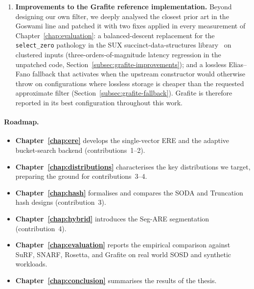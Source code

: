 \begin{enumerate}
    \item \textbf{Improvements to the Grafite reference implementation.}
    Beyond designing our own filter, we deeply analysed the closest
    prior art in the Goswami line and patched it with two
    fixes applied in every measurement of
    Chapter~\ref{chap:evaluation}: a balanced-descent replacement for
    the \texttt{select\_zero} pathology in the SUX
    succinct-data-structures library~\citep{vigna2008broadword} on clustered inputs
    (three-orders-of-magnitude latency regression in the unpatched
    code, Section~\ref{subsec:grafite-improvements}); and a lossless
    Elias--Fano fallback that activates when the upstream constructor
    would otherwise throw on configurations where lossless storage is
    cheaper than the requested approximate filter
    (Section~\ref{subsec:grafite-fallback}). Grafite is therefore
    reported in its best configuration throughout this work.
\end{enumerate}

\paragraph{Roadmap.}
\begin{itemize}
    \item \textbf{Chapter~\ref{chap:ere}} develops the single-vector
        ERE and the adaptive bucket-search backend
        (contributions~1--2).
    \item \textbf{Chapter~\ref{chap:distributions}} characterises the
        key distributions we target, preparing the ground for
        contributions~3--4.
    \item \textbf{Chapter~\ref{chap:hash}} formalises and compares the
        SODA and Truncation hash designs (contribution~3).
    \item \textbf{Chapter~\ref{chap:hybrid}} introduces the Seg-ARE
        segmentation (contribution~4).
    \item \textbf{Chapter~\ref{chap:evaluation}} reports the empirical
        comparison against SuRF, SNARF, Rosetta, and Grafite on real world SOSD
        and synthetic workloads.
    \item \textbf{Chapter~\ref{chap:conclusion}} summarises the results of the thesis.
\end{itemize}
